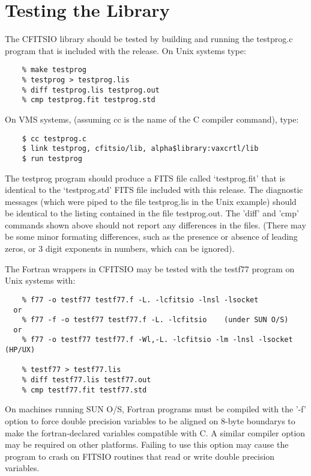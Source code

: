 \documentclass[11pt]{book}
\begin{document}
\section{Testing the Library}

The CFITSIO library should be tested by building and running
the testprog.c program that is included with the release.
On Unix systems type:

\begin{verbatim}
    % make testprog
    % testprog > testprog.lis
    % diff testprog.lis testprog.out
    % cmp testprog.fit testprog.std
\end{verbatim}
 On VMS systems,
(assuming cc is the name of the C compiler command), type:

\begin{verbatim}
    $ cc testprog.c
    $ link testprog, cfitsio/lib, alpha$library:vaxcrtl/lib
    $ run testprog
\end{verbatim}
The testprog program should produce a FITS file called `testprog.fit'
that is identical to the `testprog.std' FITS file included with this
release.  The diagnostic messages (which were piped to the file
testprog.lis in the Unix example) should be identical to the listing
contained in the file testprog.out.  The 'diff' and 'cmp' commands
shown above should not report any differences in the files.  (There
may be some minor formating differences, such as the presence or
absence of leading zeros, or 3 digit exponents in numbers,
which can be ignored).

The Fortran wrappers in CFITSIO may be tested with the testf77
program on Unix systems with:

\begin{verbatim}
    % f77 -o testf77 testf77.f -L. -lcfitsio -lnsl -lsocket
  or
    % f77 -f -o testf77 testf77.f -L. -lcfitsio    (under SUN O/S)
  or
    % f77 -o testf77 testf77.f -Wl,-L. -lcfitsio -lm -lnsl -lsocket (HP/UX)

    % testf77 > testf77.lis
    % diff testf77.lis testf77.out
    % cmp testf77.fit testf77.std
\end{verbatim}
On machines running SUN O/S, Fortran programs must be compiled with the
'-f' option to force double precision variables to be aligned on 8-byte
boundarys to make the fortran-declared variables compatible with C.  A
similar compiler option may be required on other platforms.  Failing to
use this option may cause the program to crash on FITSIO routines that
read or write double precision variables.
\end{document}
